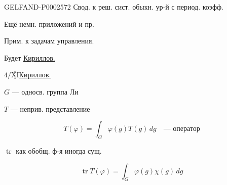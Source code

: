 \begin{GelfandAdjacentEvidence}{GELFAND-P000257}{2}
Свод. к реш. сист. обыкн. ур-й с период. коэфф.





\end{GelfandAdjacentEvidence}


Ещё немн. приложений и пр.

Прим. к задачам управления.

Будет \underline{\underline{Кириллов.}}





\medskip $4/\overline{\underline{\mathrm{XI}}}$\qquad\underline{Кириллов.}

$G$ --- односв. группа Ли

$T$ --- неприв. представление





\begin{equation*}
T(\varphi)=\int_G\varphi(g)T(g)\,dg\quad\text{--- оператор}
\end{equation*}





$\operatorname{tr}$ как обобщ. ф-я иногда сущ.





\begin{equation*}
\operatorname{tr}T(\varphi)=\int_G\varphi(g)\chi(g)\,dg
\end{equation*}

